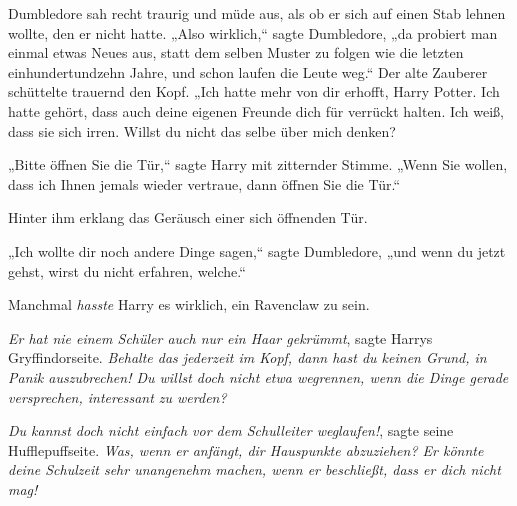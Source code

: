 Dumbledore sah recht traurig und müde aus, als ob er sich auf einen Stab lehnen wollte, den er nicht hatte.
„Also wirklich,“ sagte Dumbledore, „da probiert man einmal etwas Neues aus, statt dem selben Muster zu folgen wie die letzten einhundertundzehn Jahre, und schon laufen die Leute weg.“ Der alte Zauberer schüttelte trauernd den Kopf. „Ich hatte mehr von dir erhofft, Harry Potter. Ich hatte gehört, dass auch deine eigenen Freunde dich für verrückt halten. Ich weiß, dass sie sich irren. Willst du nicht das selbe über mich denken?

„Bitte öffnen Sie die Tür,“ sagte Harry mit zitternder Stimme. „Wenn Sie wollen, dass ich Ihnen jemals wieder vertraue, dann öffnen Sie die Tür.“

Hinter ihm erklang das Geräusch einer sich öffnenden Tür.

„Ich wollte dir noch andere Dinge sagen,“ sagte Dumbledore, „und wenn du jetzt gehst, wirst du nicht erfahren, welche.“

Manchmal \emph{hasste} Harry es wirklich, ein Ravenclaw zu sein.

\emph{Er hat nie einem Schüler auch nur ein Haar gekrümmt}, sagte Harrys Gryffindorseite. \emph{Behalte das jederzeit im Kopf, dann hast du keinen Grund, in Panik auszubrechen! Du willst doch nicht etwa wegrennen, wenn die Dinge gerade versprechen, interessant zu werden?}

\emph{Du kannst doch nicht einfach vor dem Schulleiter weglaufen!}, sagte seine Hufflepuffseite. \emph{Was, wenn er anfängt, dir Hauspunkte abzuziehen? Er könnte deine Schulzeit sehr unangenehm machen, wenn er beschließt, dass er dich nicht mag!}

